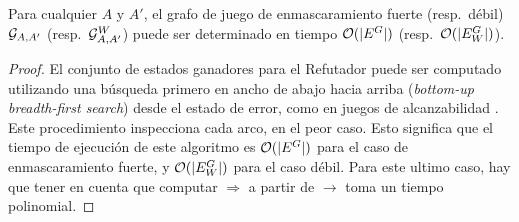 \begin{theorem}\label{thm:game-determined}
  Para cualquier $A$ y $A'$, el grafo de juego de enmascaramiento fuerte (resp.\ débil) 
  $\mathcal{G}_{A, A'}$ (resp.\ $\mathcal{G}^W_{A,A'}$) puede ser determinado en tiempo $\mathcal{O}(|E^G|)$ (resp.\ $\mathcal{O}(|E_W^G|)$).
\end{theorem}
\begin{proof}
El conjunto de estados ganadores para el Refutador puede ser computado utilizando una búsqueda primero en ancho de abajo hacia arriba (\textit{bottom-up breadth-first search}) desde el estado de error, como en juegos de alcanzabilidad \cite{Jurd11}. 
Este procedimiento inspecciona cada arco, en el peor caso. Esto significa que el tiempo de ejecución de este algoritmo es $\mathcal{O}(|E^G|)$ para el caso de enmascaramiento fuerte, y $\mathcal{O}(|E_W^G|)$ para el caso débil. Para este ultimo caso, hay que tener en cuenta que computar  
$\Rightarrow$ a partir de $\rightarrow$ toma un tiempo polinomial.
\qedhere
\end{proof} \\

